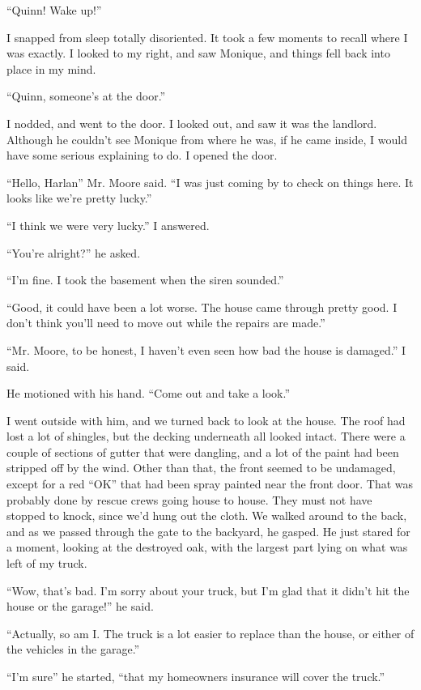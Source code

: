 ``Quinn! Wake up!''

I snapped from sleep totally disoriented. It took a few moments to recall where I was
exactly. I looked to my right, and saw Monique, and things fell back into place in my mind.

``Quinn, someone's at the door.''

I nodded, and went to the door. I looked out, and saw it was the landlord. Although he
couldn't see Monique from where he was, if he came inside, I would have some serious explaining
to do. I opened the door.

``Hello, Harlan'' Mr. Moore said. ``I was just coming by to check on things here. It looks
like we're pretty lucky.''

``I think we were very lucky.'' I answered.

``You're alright?'' he asked.

``I'm fine. I took the basement when the siren sounded.''

``Good, it could have been a lot worse. The house came through pretty good. I don't think
you'll need to move out while the repairs are made.''

``Mr. Moore, to be honest, I haven't even seen how bad the house is damaged.'' I said.

He motioned with his hand. ``Come out and take a look.''

I went outside with him, and we turned back to look at the house. The roof had lost a lot
of shingles, but the decking underneath all looked intact. There were a couple of sections of
gutter that were dangling, and a lot of the paint had been stripped off by the wind. Other than
that, the front seemed to be undamaged, except for a red ``OK'' that had been spray painted near
the front door. That was probably done by rescue crews going house to house. They must not have
stopped to knock, since we'd hung out the cloth. We walked around to the back, and as we passed
through the gate to the backyard, he gasped. He just stared for a moment, looking at the
destroyed oak, with the largest part lying on what was left of my truck.

``Wow, that's bad. I'm sorry about your truck, but I'm glad that it didn't hit the house or
the garage!'' he said.

``Actually, so am I. The truck is a lot easier to replace than the house, or either of the
vehicles in the garage.''

``I'm sure'' he started, ``that my homeowners insurance will cover the truck.''

